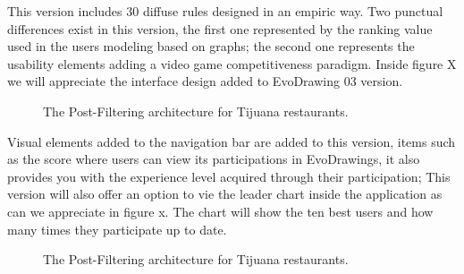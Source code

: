 This version includes 30 diffuse rules designed in an empiric way.
Two punctual differences exist in this version, the first one represented by the ranking value used in the users modeling based on graphs; the second one represents the usability elements adding a video game competitiveness paradigm.   Inside figure X we will appreciate the interface design added to EvoDrawing 03 version.

\begin{figure}
	\centering
	\setlength\fboxsep{0pt}
	\caption{The Post-Filtering architecture for Tijuana restaurants.}
	\label{fig:postfiltering}     
\end{figure}


Visual elements added to the navigation bar are added to this version, items such as the score where users can view its participations in EvoDrawings, it also provides you with the experience level acquired through their participation; This version will also offer an option to vie the leader chart inside the application as can we appreciate in figure x. The chart will show the ten best users and how many times they participate up to date.

\begin{figure}
	\centering
	\setlength\fboxsep{0pt}
	\caption{The Post-Filtering architecture for Tijuana restaurants.}
	\label{fig:postfiltering}     
\end{figure}

